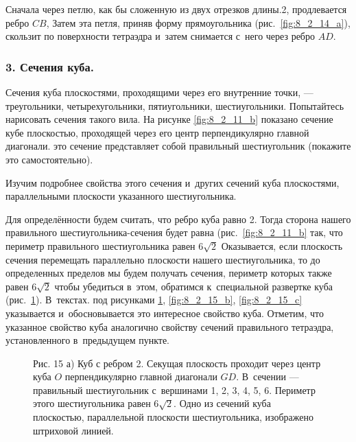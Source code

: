 
Сначала через петлю, как бы сложенную из двух отрезков длины.2, продлевается
ребро $CB$, Затем эта петля, приняв форму прямоугольника (рис.\
\ref{fig:8_2_14_a}), скользит по поверхности тетраэдра и~затем снимается
с~него через ребро $AD$.


\subsubsection{3. Сечения куба.}

Сечения куба плоскостями, проходящими через его внутренние точки,  --- треугольники,
четырехугольники, пятиугольники, шестиугольники. Попытайтесь нарисовать
сечения такого вила.
На рисунке \ref{fig:8_2_11_b} показано сечение кубе плоскостью, проходящей
через его центр перпендикулярно главной диагонали. это сечение представляет
собой правильный шестиугольник (покажите это самостоятельно).

Изучим подробнее свойства этого сечения и~других сечений куба плоскостями,
параллельными плоскости указанного шестиугольника.

Для определённости будем считать, что ребро куба равно 2. Тогда сторона нашего
правильного шестиугольника-сечения будет равна (рис.\ \ref{fig:8_2_11_b} так,
что периметр правильного шестиугольника равен $6\sqrt{2}$  Оказывается,
если плоскость сечения перемещать параллельно плоскости нашего шестиугольника,
то до определенных пределов мы будем получать сечения, периметр которых также
равен $6\sqrt{2}$ чтобы убедиться в~этом, обратимся к~специальной развертке
куба (рис.\ \ref{fig:8_2_15_a}). В~текстах. под рисунками \ref{fig:8_2_15_a},
\ref{fig:8_2_15_b}, \ref{fig:8_2_15_c} указывается и~обосновывается
это интересное свойство куба. Отметим, что указанное свойство куба аналогично
свойству сечений правильного тетраэдра, установленного в~предыдущем пункте.


\begin{figure}\label{fig:8_2_15_a}

\caption{Рис. 15 а) Куб с ребром 2. Секущая плоскость проходит через центр куба $O$
перпендикулярно главной диагонали $GD$.  В~сечении --- правильный
шестиугольник с~вершинами 1, 2, 3, 4, 5, 6. Периметр этого шестиугольника
равен $6\sqrt{2}$. Одно из сечений куба плоскостью, параллельной плоскости
шестиугольника, изображено штриховой линией.}
\end{figure}

